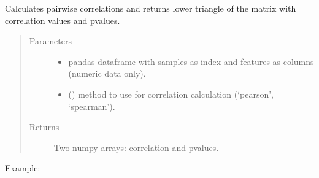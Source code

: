 \documentclass[letterpaper,10pt,english]{sphinxmanual}
\begin{document}
\begin{fulllineitems}
\label{\detokenize{_autosummary/analytics_core.analytics:analytics_core.analytics.analytics.run_efficient_correlation}}
Calculates pairwise correlations and returns lower triangle of the matrix with correlation values and p\sphinxhyphen{}values.
\begin{quote}\begin{description}
\item[{Parameters}] \leavevmode\begin{itemize}
\item {} 
 \textendash{} pandas dataframe with samples as index and features as columns (numeric data only).

\item {} 
 () \textendash{} method to use for correlation calculation (‘pearson’, ‘spearman’).

\end{itemize}

\item[{Returns}] \leavevmode
Two numpy arrays: correlation and p\sphinxhyphen{}values.

\end{description}\end{quote}

Example:

\begin{sphinxVerbatim}[commandchars=\\\{\}]
   
\end{sphinxVerbatim}

\end{fulllineitems}

\end{document}

